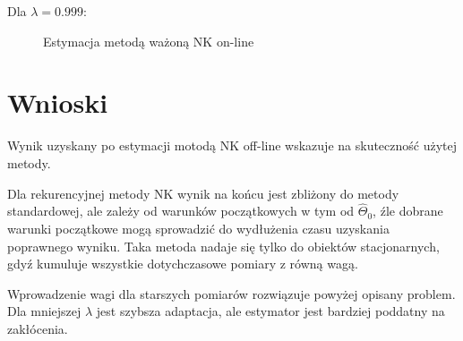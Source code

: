 \documentclass{article}
\begin{document}
Dla \( \lambda = 0.999 \):

\begin{figure}[ht]
\centering
{}
\caption{Estymacja metodą ważoną NK on-line}
\end{figure}
\section{Wnioski}

Wynik uzyskany po estymacji motodą NK off-line wskazuje na skuteczność użytej metody.
\par
Dla rekurencyjnej metody NK wynik na końcu jest zbliżony do metody standardowej, ale zależy od warunków początkowych w tym od \( \widehat{\Theta}_0 \), źle dobrane warunki początkowe mogą sprowadzić do wydłużenia czasu uzyskania poprawnego wyniku. Taka metoda nadaje się tylko do obiektów stacjonarnych, gdyź kumuluje wszystkie dotychczasowe pomiary z równą wagą.
\par
Wprowadzenie wagi dla starszych pomiarów rozwiązuje powyżej opisany problem. Dla mniejszej \( \lambda \) jest szybsza adaptacja, ale estymator jest bardziej poddatny na zakłócenia. 
\end{document}
